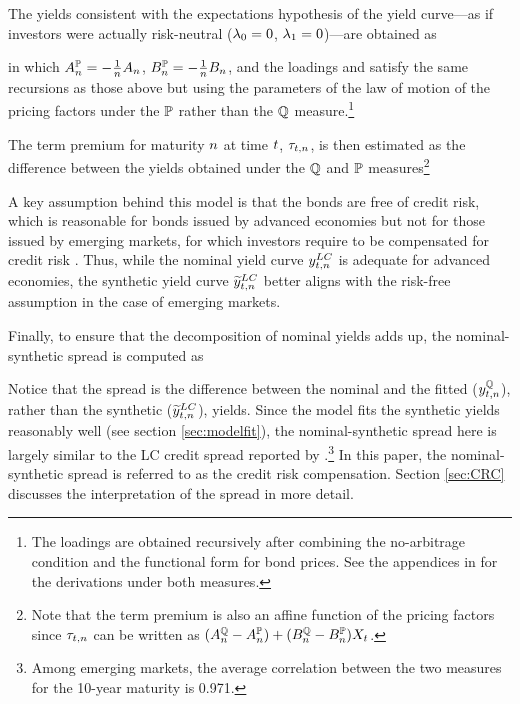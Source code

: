 {The yields consistent with the expectations hypothesis of the yield curve---as if investors were actually risk-neutral (\(\lambda_{0} = 0\), \(\lambda_{1} = 0 \))---are obtained as
	
\noindent in which \(A_{n}^{\mathbb{P}} = - \frac{1}{n} A_{n}\), \(B_{n}^{\mathbb{P}} = - \frac{1}{n} B_{n}\), and the loadings  \!and  \!satisfy the same recursions as those above but using the parameters of the law of motion of the pricing factors under the \(\mathbb{P}\) rather than the \(\mathbb{Q}\) measure.\footnote{ The loadings are obtained recursively after combining the no-arbitrage condition and the functional form for bond prices. See the appendices in \cite{Lloyd:2020} for the derivations under both measures.} 

The term premium for maturity \(n\) at time \(t\), \(\tau_{t,n}\), is then estimated as the difference between the yields obtained under the \(\mathbb{Q}\) and \(\mathbb{P}\) measures\footnote{ Note that the term premium is also an affine function of the pricing factors since \(\tau_{t,n}\) can be written as \((A_{n}^{\mathbb{Q}} - A_{n}^{\mathbb{P}}) + (B_{n}^{\mathbb{Q}}  - B_{n}^{\mathbb{P}}) X_{t} \).}
	
A key assumption behind this model is that the bonds are free of credit risk, which is reasonable for bonds issued by advanced economies but not for those issued by emerging markets, for which investors require to be compensated for credit risk \citep{DuSchreger:2016JoF,DuSchreger:2017WP}. 
Thus, while the nominal yield curve \(y_{t,n} ^{LC}\) is adequate for advanced economies, the synthetic yield curve \(\widetilde{y}_{t,n} ^{LC}\) better aligns with the risk-free assumption in the case of emerging markets.

Finally, to ensure that the decomposition of nominal yields adds up, the nominal-synthetic spread is computed as
	
Notice that the spread is the difference between the nominal and the fitted (\(y_{t,n}^{\mathbb{Q}}\)), rather than the synthetic (\(\widetilde{y}_{t,n} ^{LC}\)), yields. 
Since the model fits the synthetic yields reasonably well (see section \ref{sec:modelfit}), the nominal-synthetic spread here is largely similar to the LC credit spread reported by \cite{DuSchreger:2016JoF}.\footnote{Among emerging markets, the average correlation between the two measures for the 10-year maturity is 0.971.} 
In this paper, the nominal-synthetic spread is referred to as the credit risk compensation. Section \ref{sec:CRC} discusses the interpretation of the spread in more detail.


}
